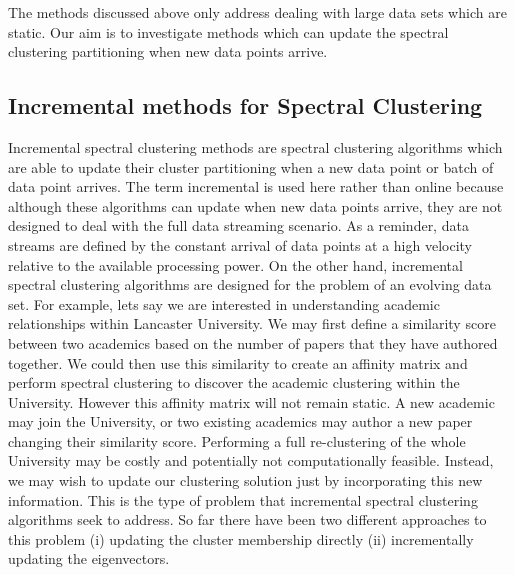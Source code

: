 
The methods discussed above only address dealing with large data sets which are static. Our aim is to investigate methods which can update the spectral clustering partitioning when new data points arrive. 

\subsection{Incremental methods for Spectral Clustering}
 \label{sec:incremental}

Incremental spectral clustering methods are spectral clustering algorithms which are able to update their cluster partitioning when a new data point or batch of data point arrives. The term incremental is used here rather than online because although these algorithms can update when new data points arrive, they are not designed to deal with the full data streaming scenario. As a reminder, data streams are defined by the constant arrival of data points at a high velocity relative to the available processing power. On the other hand, incremental spectral clustering algorithms are designed for the problem of an evolving data set. For example, lets say we are interested in understanding academic relationships within Lancaster University. We may first define a similarity score between two academics based on the number of papers that they have authored together. We could then use this similarity to create an affinity matrix and perform spectral clustering to discover the academic clustering within the University.  However this affinity matrix will not remain static. A new academic may join the University, or two existing academics may author a new paper changing their similarity score. Performing a full re-clustering of the whole University may be costly and potentially not computationally feasible. Instead, we may wish to update our clustering solution just by incorporating this new information. This is the type of problem that incremental spectral clustering algorithms seek to address.  So far there have been two different approaches to this problem (i) updating the cluster membership directly (ii) incrementally updating the eigenvectors.

